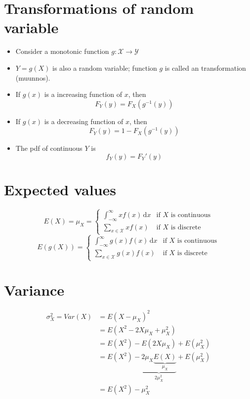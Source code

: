 \documentclass[10pt, twoside, a4paper]{book}
\newcommand{\ud}{\,\mathrm{d}}
\theoremstyle{definition}
\begin{document}
\section{Transformations of random variable}
\begin{itemize}
  \item Consider a monotonic function $g: \mathcal{X} \to \mathcal{Y}$
  \item $Y = g(X)$ is also a random variable; function $g$ is called an
  transformation (muunnos).
  \item If $g(x)$ is a increasing function of $x$, then
  $$F_Y(y) = F_X(g^{-1}(y))$$
  \item If $g(x)$ is a decreasing function of $x$, then
  $$F_Y(y) = 1 - F_X(g^{-1}(y))$$
  \item The pdf of continuous $Y$ is
  $$f_Y(y) = F_Y'(y)$$
\end{itemize}
\section{Expected values}
\begin{equation*}
\renewcommand{\arraystretch}{1.6}
E(X) = \mu_X = \left\{
\begin{array}{ll}
\int_{-\infty}^\infty x f(x) \ud x & \text{if $X$ is continuous} \\
\sum_{x \in \mathcal{X}} x f(x) & \text{if $X$ is discrete}
\end{array} \right.
\end{equation*}
\begin{equation*}
\renewcommand{\arraystretch}{1.6}
E(g(X)) =  \left\{
\begin{array}{ll}
\int_{-\infty}^\infty g(x) f(x) \ud x & \text{if $X$ is continuous} \\
\sum_{x \in \mathcal{X}} g(x) f(x) & \text{if $X$ is discrete}
\end{array} \right.
\end{equation*}
\section{Variance}
\begin{equation*}
\renewcommand{\arraystretch}{1.6}
\begin{array}{ll}
\sigma_X^2 = Var(X) & = E(X - \mu_X)^2 \\
& = E(X^2 - 2X\mu_X + \mu_X^2) \\
& = E(X^2) - E(2X\mu_X) + E(\mu_X^2) \\
& = E(X^2) - \underbrace{2\mu_X \underbrace{E(X)}_{\mu_X}}_{2\mu_X^2} +
E(\mu_X^2) \\
& = E(X^2) - \mu_X^2 \\
\end{array}
\end{equation*}
\end{document}
